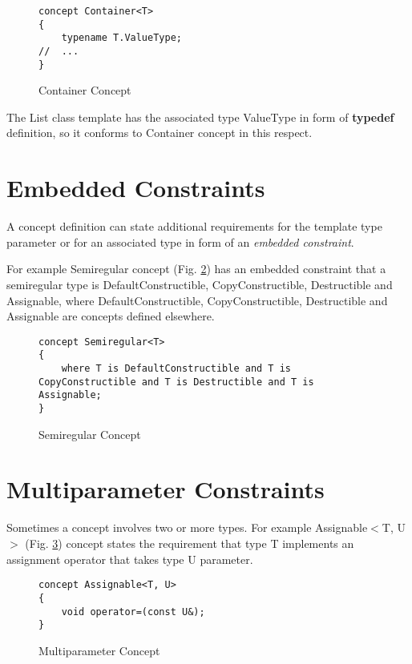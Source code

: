 \documentclass[oneside, a4paper, 11pt]{article}
\begin{document}
\begin{figure}[htb]\caption{Container Concept}\label{fig:container}
\begin{lstlisting}[frame=trBL]
concept Container<T>
{
    typename T.ValueType;
//  ...
}
\end{lstlisting}
\end{figure}

The List class template has the associated type ValueType in form of \textbf{typedef} definition,
so it conforms to Container concept in this respect.

\section{Embedded Constraints}

A concept definition can state additional requirements for the template type parameter or
for an associated type in form of an \emph{embedded constraint}.

For example Semiregular concept (Fig. \ref{fig:semiregular}) has an embedded constraint that
a semiregular type is DefaultConstructible, CopyConstructible, Destructible and Assignable,
where DefaultConstructible, CopyConstructible, Destructible and Assignable are concepts defined
elsewhere.

\begin{figure}[htb]\caption{Semiregular Concept}\label{fig:semiregular}
\begin{lstlisting}[frame=trBL]
concept Semiregular<T>
{
    where T is DefaultConstructible and T is CopyConstructible and T is Destructible and T is Assignable;
}
\end{lstlisting}
\end{figure}

\section{Multiparameter Constraints}

Sometimes a concept involves two or more types.
For example Assignable$<$T, U$>$ (Fig. \ref{fig:multiconcept})
concept states the requirement that type T implements an assignment operator that
takes type U parameter.

\begin{figure}[htb]\caption{Multiparameter Concept}\label{fig:multiconcept}
\begin{lstlisting}[frame=trBL]
concept Assignable<T, U>
{
    void operator=(const U&);
}
\end{lstlisting}
\end{figure}
\end{document}
